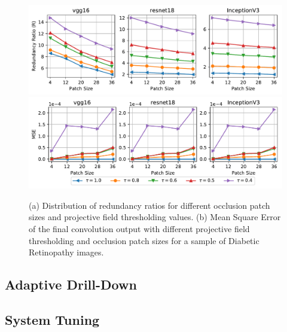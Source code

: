 \begin{figure}[t]
\includegraphics[width=\columnwidth]{images/th_redundancy_ratio}
\includegraphics[width=\columnwidth]{images/mse_thresholding}
\caption{(a) Distribution of redundancy ratios for different occlusion patch sizes and projective field thresholding values. (b) Mean Square Error of the final convolution output with different projective field thresholding and occlusion patch sizes for a sample of Diabetic Retinopathy images.}
\label{fig:th_redundancy_ratio}
\end{figure}


\subsection{Adaptive Drill-Down}

\subsection{System Tuning}
